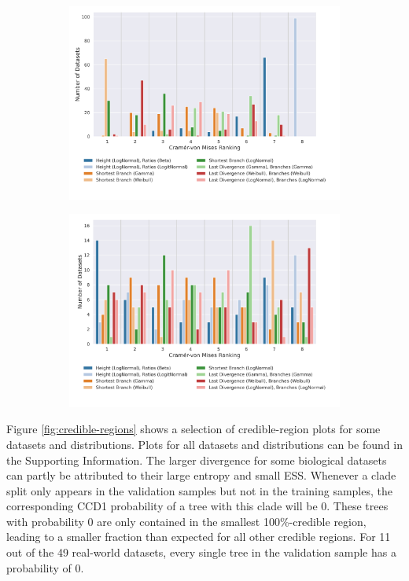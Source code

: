 \documentclass[10pt,letterpaper]{article}
\begin{document}
\begin{figure}
	\begin{subfigure}[b]{0.45\textwidth}
		\centering
		\includegraphics[width=\textwidth]{figures/yule-400-ccd1-cvm-ranking.png}
	\end{subfigure}
	\begin{subfigure}[b]{0.45\textwidth}
		\centering
		\includegraphics[width=\textwidth]{figures/bio-ccd1-cvm-ranking.png}
	\end{subfigure}
	
	\label{fig:cramer-von-mises-ranking}
\end{figure}

Figure \ref{fig:credible-regions} shows a selection of credible-region plots for some datasets and distributions. Plots for all datasets and distributions can be found in the Supporting Information. The larger divergence for some biological datasets can partly be attributed to their large entropy and small ESS. Whenever a clade split only appears in the validation samples but not in the training samples, the corresponding CCD1 probability of a tree with this clade will be $0$. These trees with probability $0$ are only contained in the smallest 100\%-credible region, leading to a smaller fraction than expected for all other credible regions. For 11 out of the 49 real-world datasets, every single tree in the validation sample has a probability of $0$.
\end{document}
